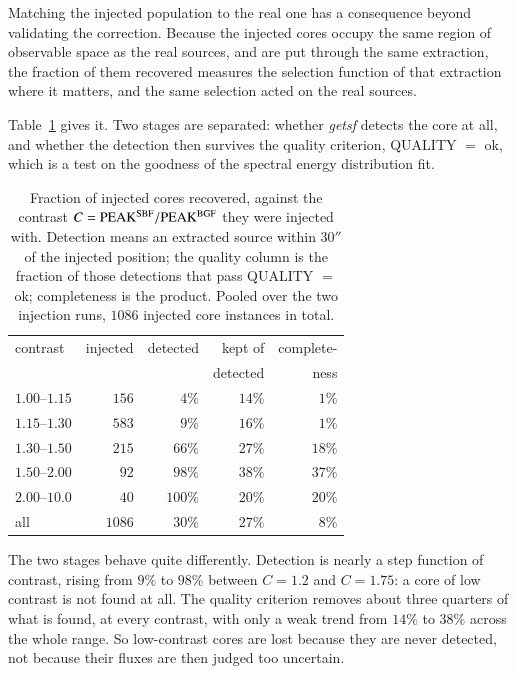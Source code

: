 \documentclass{aa}
\begin{document}
Matching the injected population to the real one has a consequence beyond
validating the correction. Because the injected cores occupy the same region
of observable space as the real sources, and are put through the same
extraction, the fraction of them recovered measures the selection function of
that extraction where it matters, and the same selection acted on the real
sources.

Table~\ref{tab:selection} gives it. Two stages are separated: whether
\emph{getsf} detects the core at all, and whether the detection then survives
the quality criterion, QUALITY $=$ ok, which is a test on the goodness of the
spectral energy distribution fit.

\begin{table}
\centering
\caption{Fraction of injected cores recovered, against the contrast
$C = {\rm PEAK^{SBF}}/{\rm PEAK^{BGF}}$ they were injected with.
Detection means an extracted source within $30''$ of the injected position;
the quality column is the fraction of those detections that pass
QUALITY $=$ ok; completeness is the product. Pooled over the two injection
runs, $1086$ injected core instances in total.}
\label{tab:selection}
\begin{tabular}{lrrrr}
\hline\hline
contrast & injected & detected & kept of & complete- \\
         &          &          & detected & ness \\
\hline
$1.00$--$1.15$ & $156$  & $4\%$   & $14\%$ & $1\%$ \\
$1.15$--$1.30$ & $583$  & $9\%$   & $16\%$ & $1\%$ \\
$1.30$--$1.50$ & $215$  & $66\%$  & $27\%$ & $18\%$ \\
$1.50$--$2.00$ & $92$   & $98\%$  & $38\%$ & $37\%$ \\
$2.00$--$10.0$ & $40$   & $100\%$ & $20\%$ & $20\%$ \\
\hline
all            & $1086$ & $30\%$  & $27\%$ & $8\%$ \\
\hline
\end{tabular}
\end{table}

The two stages behave quite differently. Detection is nearly a step function
of contrast, rising from $9\%$ to $98\%$ between $C = 1.2$ and $C = 1.75$: a
core of low contrast is not found at all. The quality criterion removes about
three quarters of what is found, at every contrast, with only a weak trend
from $14\%$ to $38\%$ across the whole range. So low-contrast cores are lost
because they are never detected, not because their fluxes are then judged too
uncertain.
\end{document}
